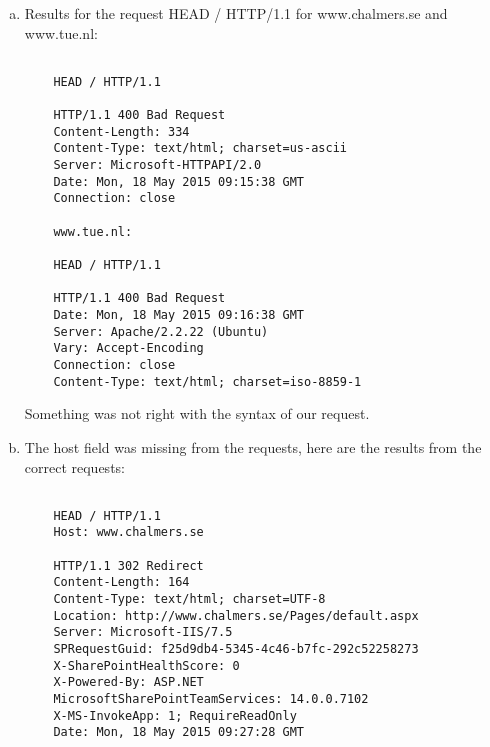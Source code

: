 \documentclass[a4paper,9pt,fleqn]{article}
\begin{document}
\begin{enumerate}[{Task} 1]
\begin{enumerate}[a)]
		\newpage
		Results for the request HEAD / HTTP/1.0 for www.tue.nl:

\begin{lstlisting}
	

	HEAD / HTTP/1.0

	HTTP/1.1 301 Moved Permanently
	Date: Mon, 18 May 2015 08:24:17 GMT
	Server: Apache/2.2.22 (Ubuntu)
	X-Powered-By: PHP/5.3.10-1ubuntu3.18
	Location: http://www.tue.nl/
	Vary: Accept-Encoding
	Content-Type: text/html


	Connection closed by foreign host.
\end{lstlisting}

		{\outp www.tue.nl} is using the web server type {\outp Apache/2.2.22 (Ubuntu)}.
		301 Move Permanently means that the resource we are requesting has been redirected
		to a new URL. The new URL is specified in the Location field. In this case www.tue.nl
		is redirecting to http://www.tue.nl/. The Vary field specifies which fields of the
		request header to take into account when trying to find the right object in the cache.
		\\
		\item 
		Results for the request HEAD / HTTP/1.1 for www.chalmers.se and www.tue.nl:

\begin{lstlisting}

	HEAD / HTTP/1.1

	HTTP/1.1 400 Bad Request
	Content-Length: 334
	Content-Type: text/html; charset=us-ascii
	Server: Microsoft-HTTPAPI/2.0
	Date: Mon, 18 May 2015 09:15:38 GMT
	Connection: close

	www.tue.nl:

	HEAD / HTTP/1.1

	HTTP/1.1 400 Bad Request
	Date: Mon, 18 May 2015 09:16:38 GMT
	Server: Apache/2.2.22 (Ubuntu)
	Vary: Accept-Encoding
	Connection: close
	Content-Type: text/html; charset=iso-8859-1
\end{lstlisting}
		
		Something was not right with the syntax of our request.
		\\
		\item 
		The host field was missing from the requests, here are the results from the correct requests:

\begin{lstlisting}

	HEAD / HTTP/1.1
	Host: www.chalmers.se

	HTTP/1.1 302 Redirect
	Content-Length: 164
	Content-Type: text/html; charset=UTF-8
	Location: http://www.chalmers.se/Pages/default.aspx
	Server: Microsoft-IIS/7.5
	SPRequestGuid: f25d9db4-5345-4c46-b7fc-292c52258273
	X-SharePointHealthScore: 0
	X-Powered-By: ASP.NET
	MicrosoftSharePointTeamServices: 14.0.0.7102
	X-MS-InvokeApp: 1; RequireReadOnly
	Date: Mon, 18 May 2015 09:27:28 GMT



\end{lstlisting}
\end{enumerate}
\end{enumerate}
\end{document}
